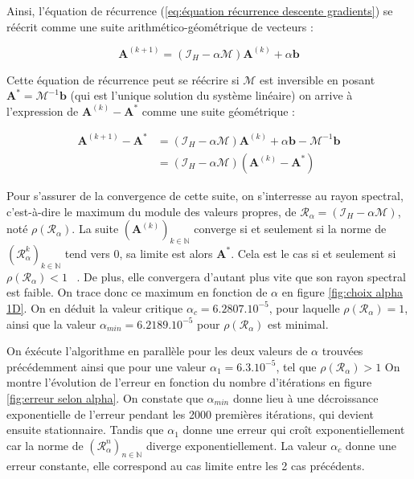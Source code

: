 \documentclass[12pt]{report}
\begin{document}
Ainsi, l'équation de récurrence (\ref{eq:équation récurrence descente gradients}) se réécrit comme une suite arithmético-géométrique de vecteurs :

\begin{equation}
    \bm{A}^{(k+1)} = (\mathcal{I}_H - \alpha \mathcal{M} )  \bm{A}^{(k)} + \alpha\bm{b}
\label{eq:équation récurrence descente gradients v2}
\end{equation}

Cette équation de récurrence peut se réécrire si $\mathcal M$ est inversible en posant $\bm{A^*} = \mathcal {M}^{-1}\bm{b}$ (qui est l'unique solution du système linéaire) on arrive à l'expression de $\bm{A}^{(k)}-\bm{A^*} $ comme une suite géométrique :

\begin{equation}
    \begin{aligned}
        \bm{A}^{(k+1)}-\bm{A^*}  &= (\mathcal{I}_H - \alpha \mathcal{M} )  \bm{A}^{(k)} + \alpha\bm{b} - \mathcal {M}^{-1}\bm{b}\\
         &= (\mathcal{I}_H - \alpha \mathcal{M} ) (\bm{A}^{(k)}-\bm{A^*} )
    \end{aligned}
\label{eq:équation récurrence descente gradients v2}
\end{equation}

Pour s'assurer de la convergence de cette suite, on s'interresse au rayon spectral, c'est-à-dire le maximum du module des valeurs propres, de $\mathcal{R}_\alpha = (\mathcal{I}_H - \alpha \mathcal{M} )$, noté $\rho(\mathcal{R}_\alpha)$.
La suite $(\bm{A}^{(k)})_{k\in \mathbb{N}}$ converge si et seulement si la norme de $(\mathcal{R}_\alpha ^k)_{k\in \mathbb{N}}$ tend vers 0, sa limite est alors $\bm A^*$.
Cela est le cas si et seulement si $\rho(\mathcal{R}_\alpha)<1$ ~\cite{WikiRayonSpectral}.
De plus, elle convergera d'autant plus vite que son rayon spectral est faible.
On trace donc ce maximum en fonction de $\alpha$ en figure \ref{fig:choix alpha 1D}. 
On en déduit la valeur critique $\alpha_c = 6.2807.10^{-5}$, pour laquelle $\rho(\mathcal{R}_\alpha)=1$, ainsi que la valeur $\alpha_{min} = 6.2189.10^{-5}$ pour $\rho(\mathcal{R}_\alpha)$ est minimal.

On éxécute l'algorithme en parallèle pour les deux valeurs de $\alpha$ trouvées précédemment ainsi que pour une valeur $\alpha_1 = 6.3.10^{-5}$, tel que $\rho(\mathcal{R}_\alpha)>1$
On montre l'évolution de l'erreur en fonction du nombre d'itérations en figure \ref{fig:erreur selon alpha}. 
On constate que $\alpha_{min}$ donne lieu à une décroissance exponentielle de l'erreur pendant les 2000 premières itérations, qui 
devient ensuite stationnaire. 
Tandis que $\alpha_1$ donne une erreur qui croît exponentiellement car la norme de $(\mathcal{R}_\alpha ^n)_{n\in \mathbb{N}}$ diverge exponentiellement. 
La valeur $\alpha_c$ donne une erreur constante, 
elle correspond au cas limite entre les 2 cas précédents.
\end{document}
